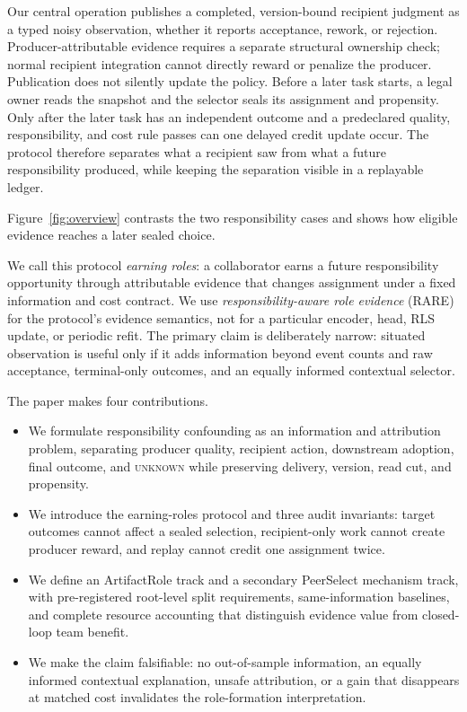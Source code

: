 \documentclass[sigconf,anonymous]{aamas}
\newcommand{\unknown}{\textsc{unknown}}
\begin{document}
Our central operation publishes a completed, version-bound recipient judgment as a typed noisy observation, whether it reports acceptance, rework, or rejection. Producer-attributable evidence requires a separate structural ownership check; normal recipient integration cannot directly reward or penalize the producer. Publication does not silently update the policy. Before a later task starts, a legal owner reads the snapshot and the selector seals its assignment and propensity. Only after the later task has an independent outcome and a predeclared quality, responsibility, and cost rule passes can one delayed credit update occur. The protocol therefore separates what a recipient saw from what a future responsibility produced, while keeping the separation visible in a replayable ledger.

Figure~\ref{fig:overview} contrasts the two responsibility cases and shows how eligible evidence reaches a later sealed choice.

We call this protocol \emph{earning roles}: a collaborator earns a future responsibility opportunity through attributable evidence that changes assignment under a fixed information and cost contract. We use \emph{responsibility-aware role evidence} (RARE) for the protocol's evidence semantics, not for a particular encoder, head, RLS update, or periodic refit. The primary claim is deliberately narrow: situated observation is useful only if it adds information beyond event counts and raw acceptance, terminal-only outcomes, and an equally informed contextual selector.

The paper makes four contributions.
\begin{itemize}
  \item We formulate responsibility confounding as an information and attribution problem, separating producer quality, recipient action, downstream adoption, final outcome, and \unknown{} while preserving delivery, version, read cut, and propensity.
  \item We introduce the earning-roles protocol and three audit invariants: target outcomes cannot affect a sealed selection, recipient-only work cannot create producer reward, and replay cannot credit one assignment twice.
  \item We define an ArtifactRole track and a secondary PeerSelect mechanism track, with pre-registered root-level split requirements, same-information baselines, and complete resource accounting that distinguish evidence value from closed-loop team benefit.
  \item We make the claim falsifiable: no out-of-sample information, an equally informed contextual explanation, unsafe attribution, or a gain that disappears at matched cost invalidates the role-formation interpretation.
\end{itemize}
\end{document}
